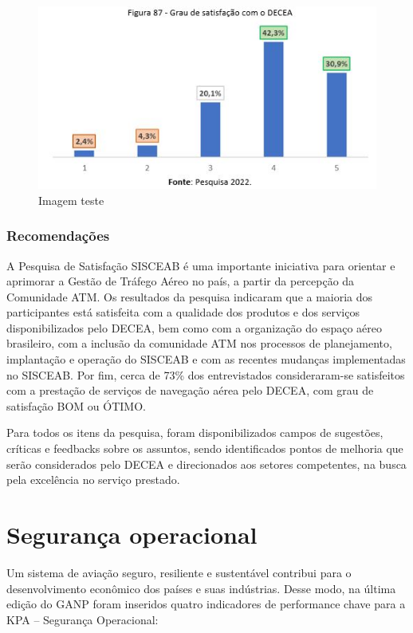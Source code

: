 \documentclass[
]{book}
\begin{document}
\begin{figure}
\centering
\includegraphics{imagens/fig74.jpg}
\caption{Imagem teste}
\end{figure}

\hypertarget{recomendauxe7uxf5es}{%
\subsubsection{Recomendações}\label{recomendauxe7uxf5es}}

A Pesquisa de Satisfação SISCEAB é uma importante iniciativa para orientar e aprimorar a Gestão de Tráfego Aéreo no país, a partir da percepção da Comunidade ATM. Os resultados da pesquisa indicaram que a maioria dos participantes está satisfeita com a qualidade dos produtos e dos serviços disponibilizados pelo DECEA, bem como com a organização do espaço aéreo brasileiro, com a inclusão da comunidade ATM nos processos de planejamento, implantação e operação do SISCEAB e com as recentes mudanças implementadas no SISCEAB. Por fim, cerca de 73\% dos entrevistados consideraram-se satisfeitos com a prestação de serviços de navegação aérea pelo DECEA, com grau de satisfação BOM ou ÓTIMO.

Para todos os itens da pesquisa, foram disponibilizados campos de sugestões, críticas e feedbacks sobre os assuntos, sendo identificados pontos de melhoria que serão considerados pelo DECEA e direcionados aos setores competentes, na busca pela excelência no serviço prestado.

\hypertarget{seguranuxe7a-operacional}{%
\section{Segurança operacional}\label{seguranuxe7a-operacional}}

Um sistema de aviação seguro, resiliente e sustentável contribui para o desenvolvimento econômico dos países e suas indústrias. Desse modo, na última edição do GANP foram inseridos quatro indicadores de performance chave para a KPA -- Segurança Operacional:
\end{document}
